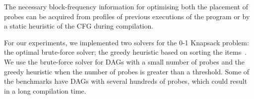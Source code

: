\documentclass[sigplan,10pt]{acmart}
\theoremstyle{definition}
\begin{document}



The necessary block-frequency information for optimising both the placement of probes can be acquired from profiles of previous executions of the program or by a static heuristic of the CFG during compilation.

For our experiments, we implemented two solvers for the 0-1 Knapsack problem:
the optimal brute-force solver;
the greedy heuristic based on sorting the items~\citep{dantzig57}.
We use the brute-force solver for DAGs with a small number of probes and the greedy heuristic when the number of probes is greater than a threshold.
Some of the benchmarks have DAGs with several hundreds of probes, which could result in a long compilation time.
\end{document}
